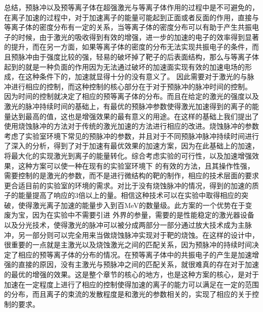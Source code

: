 总结，预脉冲以及预等离子体在超强激光与等离子体作用的过程中是不可避免的，在离子加速的过程中，对于加速离子的能量可能起到正面或者反面的作用，直接与等离子体的密度分布有一定的关系，当等离子体的密度分布可以有助于产生共振电子的时候，由于激光的吸收得到有效的增强，进一步的加速的电子的效率得到显著的提升，而在另一方面，如果等离子体的密度的分布无法实现共振电子的条件，而且预脉冲由于强度比较的强，轻易的破坏掉了靶子的后表面结构，那么与等离子体起到的就是一种负面的作用因为无法通过破坏的加速面实现有效的加速电场的形成，在这种条件下的，加速就显得十分的没有意义了。 因此需要对于激光的与脉冲进行相应的控制，而这种控制的核心部分在于对于预脉冲的脉冲时间的控制。 因为时间的控制就决定了相应的预等离子体的分布。而且在给定的激光的强度以及激光的脉冲持续时间的基础上，有最优的预脉冲参数使得激光加速得到的离子的能量达到最高的值，这也是增强效果的最有意义的用途。在这样的基础上我们提出了使用烧蚀脉冲的方法对于传统的激光加速的方法进行相应的改进。烧蚀脉冲的参数考虑了实验室环境下常见的预脉冲的参数，并且对于不同预脉冲脉冲持续时间进行了深入的分析，得到了对于加速有最优效果的加速方案，因为在此基础上的加速，将最大化的实现激光到离子的能量转化。综合考虑实验的可行性，以及加速增强效果，这种方案可以使一种在现有的实验室环境下 的有效的方法，且其操作性强，需要控制的是激光的参数，而不是进行微结构的靶的制作，相应的技术层面的要求更合适目前的实验室的环境的需求。对比于没有烧蚀脉冲的情况，得到的加速的质子的能量提高了响应的3倍以上的量。相信这种技术可以在实验中取得相应的突破，使得激光离子加速的能量步入到百MeV的数量级。此方案的一个优势在于变废为宝，因为在实验中不需要引进 外界的参量，需要的是性能稳定的激光器设备以及分光技术，使得激光的脉冲可以被分成两部分一部分通过放大技术成为主脉冲，另一部分则可以完全用来当做烧蚀脉冲实现对于靶的烧蚀。在这样的设计中，很重要的一点就是主激光以及烧蚀激光之间的匹配关系，因为预脉冲的持续时间决定了相应的预等离子体的分布的情况。在预等离子体中的共振电子的产生是加速增强的直接的原因，没有主激光与预脉冲之间的匹配关系，就很难真的存在对于加速的最优的增强的效果。这是整个章节的核心的地方，也是这种方案的核心，是对于加速在一定程度上进行了相应的控制使得加速的离子的能力可以满足在一定的范围的分布，而且离子的束流的发散程度是和激光的参数相关的，实现了相应的关于控制的要求。





